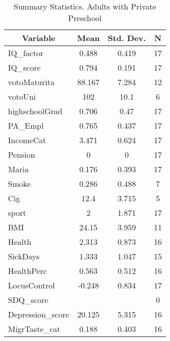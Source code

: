 
\begin{table}[htbp]\centering \caption{Summary Statistics. Adults with Private Preschool \label{schoolAdultmaternaPriv}}
\begin{tabular}{l c c  c}\hline\hline
\multicolumn{1}{c}{\textbf{Variable}} & \textbf{Mean}
 & \textbf{Std. Dev.} & \textbf{N}\\ \hline
IQ\_factor & 0.488 & 0.419  & 17\\
IQ\_score & 0.794 & 0.191  & 17\\
votoMaturita & 88.167 & 7.284  & 12\\
votoUni & 102 & 10.1  & 6\\
highschoolGrad & 0.706 & 0.47  & 17\\
PA\_Empl & 0.765 & 0.437  & 17\\
IncomeCat & 3.471 & 0.624  & 17\\
Pension & 0 & 0  & 17\\
Maria & 0.176 & 0.393  & 17\\
Smoke & 0.286 & 0.488  & 7\\
Cig & 12.4 & 3.715  & 5\\
sport & 2 & 1.871  & 17\\
BMI & 24.15 & 3.959  & 11\\
Health & 2.313 & 0.873  & 16\\
SickDays & 1.333 & 1.047  & 15\\
HealthPerc & 0.563 & 0.512  & 16\\
LocusControl & -0.248 & 0.834  & 17\\
SDQ\_score &  &   & 0\\
Depression\_score & 20.125 & 5.315  & 16\\
MigrTaste\_cat & 0.188 & 0.403  & 16\\
\hline\end{tabular}
\end{table}
